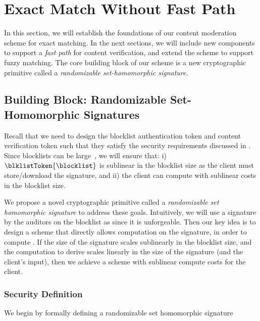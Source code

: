 \section{Exact Match Without Fast Path}
%

In this section, we will establish the foundations of our content moderation scheme for exact matching. In the next sections, we will include new components to support a \emph{fast path} for content verification, and extend the scheme to support fuzzy matching. The core building block of our scheme is a new cryptographic primitive called a \emph{randomizable set-homomorphic signature}. 

\subsection{Building Block: Randomizable Set-Homomorphic Signatures}
%
Recall that we need to design the blocklist authentication token \blklistToken{\blocklist} and content verification token \contentToken{\clientData} such that they satisfy the security requirements discussed in . Since blocklists can be large~\cite{content_mod_e2ee},  we will ensure that: i) $\blklistToken{\blocklist}$ is sublinear in the blocklist size as the client must store/download the signature, and ii) the client can compute \contentToken{\clientData} with sublinear costs in the blocklist size.



We propose a novel cryptographic primitive called a \textit{randomizable set homomorphic signature} to address these goals. Intuitively, we will use a signature by the auditors on the blocklist as \blklistToken{\blocklist} since it is unforgeable. Then  our key idea is to design a scheme that directly allows computation on the signature, in order to compute \contentToken{\clientData}. If the size of the signature scales sublinearly in the blocklist size, and the computation to derive \contentToken{\clientData} scales linearly in the size of the signature (and the client's input), then we achieve a scheme with sublinear compute costs for the client. 



\subsubsection{Security Definition}
%
We begin by formally defining a randomizable set homomorphic signature 

